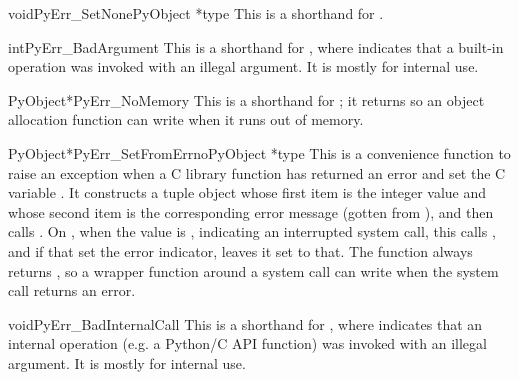 \documentclass{manual}
\begin{document}
\begin{cfuncdesc}{void}{PyErr_SetNone}{PyObject *type}
This is a shorthand for .
\end{cfuncdesc}

\begin{cfuncdesc}{int}{PyErr_BadArgument}{}
This is a shorthand for , where  indicates that a built-in operation
was invoked with an illegal argument.  It is mostly for internal use.
\end{cfuncdesc}

\begin{cfuncdesc}{PyObject*}{PyErr_NoMemory}{}
This is a shorthand for ; it
returns \NULL{} so an object allocation function can write
 when it runs out of memory.
\end{cfuncdesc}

\begin{cfuncdesc}{PyObject*}{PyErr_SetFromErrno}{PyObject *type}
This is a convenience function to raise an exception when a C library
function has returned an error and set the C variable .
It constructs a tuple object whose first item is the integer
 value and whose second item is the corresponding error
message (gotten from ), and
then calls
.  On \UNIX{}, when
the  value is , indicating an interrupted
system call, this calls , and if that set
the error indicator, leaves it set to that.  The function always
returns \NULL{}, so a wrapper function around a system call can write 
 when  the system call returns an
error.
\end{cfuncdesc}

\begin{cfuncdesc}{void}{PyErr_BadInternalCall}{}
This is a shorthand for , where  indicates that an internal
operation (e.g. a Python/C API function) was invoked with an illegal
argument.  It is mostly for internal use.
\end{cfuncdesc}
\end{document}
